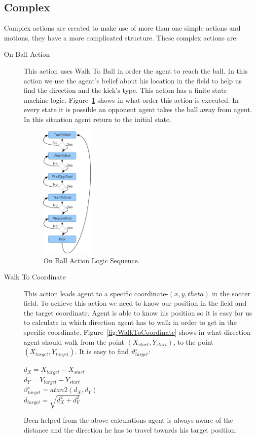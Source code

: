 \subsection{Complex}
Complex actions are created to make use of more than one simple actions and motions, they have a more complicated structure. These complex actions are:
\begin{description}
 \item[On Ball Action] This action uses Walk To Ball in order the agent to reach the ball. In this action we use the agent's belief about his location in the field to help us find the direction and the kick's type. This action has a finite state machine logic. Figure~\ref{fig:GoKickBallToGoal} shows in what order this action is executed. In every state it is possible an opponent agent takes the ball away from agent. In this situation agent return to the initial state.


 \begin{figure}[t!]
\centering
  \includegraphics[width=0.25\textwidth]{Chapter3/figures/KickFSM.pdf}
  \caption{On Ball Action Logic Sequence.}
  \label{fig:GoKickBallToGoal}
\end{figure}



 \item[Walk To Coordinate]
 This action leads agent to a specific coordinate-$(x, y, theta)$ in the soccer field. To achieve this action we need to know our position in the field and the target coordinate. Agent is able to know his position so it is easy for us to calculate in which direction agent has to walk in order to get in the specific coordinate. Figure~\ref{fig:WalkToCoordinate} shows in what direction agent should walk from the point $(X_{start},Y_{start})$, to the point $(X_{target},Y_{target})$. It is easy to find $\vartheta_{target}^{\circ}$:\\
\begin{center}
$d_{X} = X_{target} - X_{start}$\\
$d_{Y} = Y_{target} - Y_{start}$\\
$\vartheta_{target}^{\circ} = atan2(d_{X},d_{Y})$\\
$d_{target} = \sqrt{d_{X}^2 + d_{Y}^2}$
\end{center}
Been helped from the above calculations agent is always aware of the distance and the direction he has to travel towards his target position. 



\end{description}
